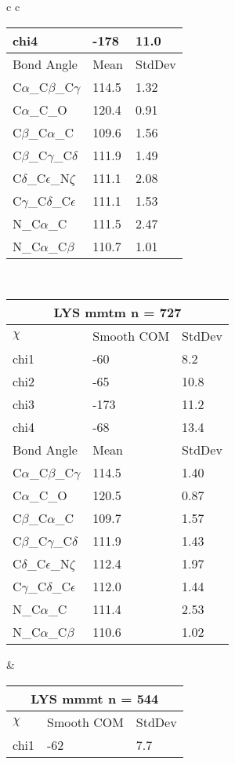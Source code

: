 \begin{longtable}{ c c }
\begin{tabular}{ l l l }
  chi4 & -178 & 11.0 \\ \midrule
  Bond Angle   & Mean     & StdDev \\ \midrule
  C$\alpha$\_C$\beta$\_C$\gamma$ & 114.5 & 1.32\\
  C$\alpha$\_C\_O & 120.4 & 0.91\\
  C$\beta$\_C$\alpha$\_C & 109.6 & 1.56\\
  C$\beta$\_C$\gamma$\_C$\delta$ & 111.9 & 1.49\\
  C$\delta$\_C$\epsilon$\_N$\zeta$ & 111.1 & 2.08\\
  C$\gamma$\_C$\delta$\_C$\epsilon$ & 111.1 & 1.53\\
  N\_C$\alpha$\_C & 111.5 & 2.47\\
  N\_C$\alpha$\_C$\beta$ & 110.7 & 1.01\\
  \bottomrule
  \end{tabular}
  \\
  \begin{tabular}{ l l l }
  \toprule
  \multicolumn{3}{c}{LYS \textbf{mmtm} n = 727} \\ \toprule
  $\chi$       & Smooth COM & StdDev \\ \midrule
  chi1 & -60 & 8.2 \\ 
  chi2 & -65 & 10.8 \\ 
  chi3 & -173 & 11.2 \\ 
  chi4 & -68 & 13.4 \\ \midrule
  Bond Angle   & Mean     & StdDev \\ \midrule
  C$\alpha$\_C$\beta$\_C$\gamma$ & 114.5 & 1.40\\
  C$\alpha$\_C\_O & 120.5 & 0.87\\
  C$\beta$\_C$\alpha$\_C & 109.7 & 1.57\\
  C$\beta$\_C$\gamma$\_C$\delta$ & 111.9 & 1.43\\
  C$\delta$\_C$\epsilon$\_N$\zeta$ & 112.4 & 1.97\\
  C$\gamma$\_C$\delta$\_C$\epsilon$ & 112.0 & 1.44\\
  N\_C$\alpha$\_C & 111.4 & 2.53\\
  N\_C$\alpha$\_C$\beta$ & 110.6 & 1.02\\
  \bottomrule
  \end{tabular}
  &
  \begin{tabular}{ l l l }
  \toprule
  \multicolumn{3}{c}{LYS \textbf{mmmt} n = 544} \\ \toprule
  $\chi$       & Smooth COM & StdDev \\ \midrule
  chi1 & -62 & 7.7 \\ 

\end{tabular}
\end{longtable}
